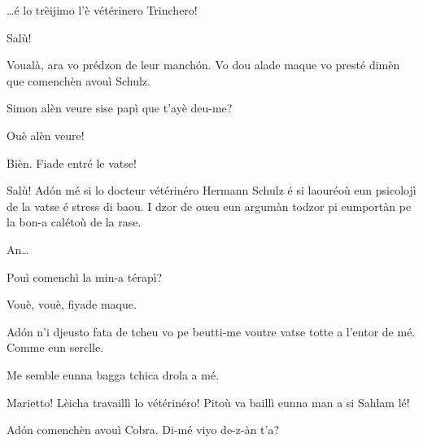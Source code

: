 \begin{drama}
\Chefspeaks \ldots é lo trèijimo l'è vétérinero Trinchero!


\Trincherospeaks {} Salù!


\Chefspeaks Voualà, ara vo prédzon de leur manch\'on. Vo dou  alade maque vo presté dimèn que comenchèn avouì Schulz.


\Chefspeaks Simon alèn veure sise papì que t'ayè deu-me?

\Simonspeaks Ouè alèn veure!

\Chefspeaks Bièn.  Fiade entré le vatse!




\Schulzspeaks {} Salù! Ad\'on mé si lo docteur vétérinéro Hermann Schulz é si laouréoù eun psicolojì de la vatse é stress di baou. I dzor de oueu eun argumàn todzor pi eumportàn pe la bon-a calétoù de la rase.

\Cienspeaks An\ldots

\Schulzspeaks Pouì comenchì la min-a térapì?

\Cienspeaks Vouè, vouè, fiyade maque.

\Schulzspeaks Ad\'on n’i djeusto fata de tcheu vo pe beutti-me voutre vatse totte a l'entor de mé. Comme eun serclle.

\Mariettospeaks {} Me semble eunna bagga tchica drola a mé.

\Cienspeaks Marietto! Lèicha travaillì lo vétérinéro! Pitoù va baillì eunna man a si Sahlam lé!


\Schulzspeaks Ad\'on comenchèn avouì Cobra. Di-mé viyo de-z-àn t’a?


\end{drama}
